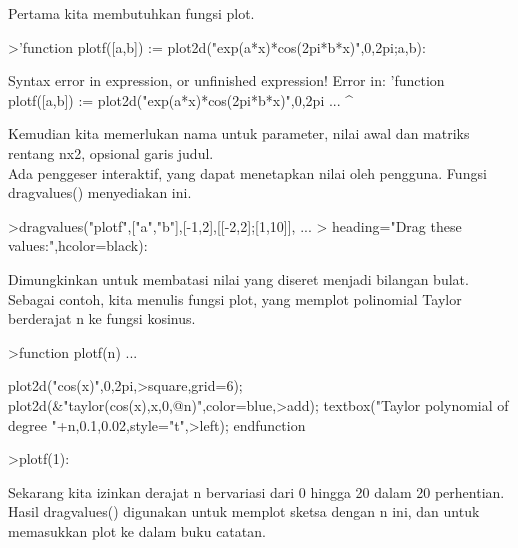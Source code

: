 \documentclass[a4paper,10pt]{article}
\begin{document}
\begin{eulernotebook}
\begin{eulercomment}
\begin{eulercomment}
\begin{eulercomment}
\begin{eulercomment}
\begin{eulercomment}
Pertama kita membutuhkan fungsi plot.
\end{eulercomment}
\begin{eulerprompt}
>'function plotf([a,b]) := plot2d("exp(a*x)*cos(2pi*b*x)",0,2pi;a,b):
\end{eulerprompt}
\begin{euleroutput}
  Syntax error in expression, or unfinished expression!
  Error in:
  'function plotf([a,b]) := plot2d("exp(a*x)*cos(2pi*b*x)",0,2pi ...
  ^
\end{euleroutput}
\begin{eulercomment}
Kemudian kita memerlukan nama untuk parameter, nilai awal dan matriks
rentang nx2, opsional garis judul.\\
Ada penggeser interaktif, yang dapat menetapkan nilai oleh pengguna.
Fungsi dragvalues() menyediakan ini.
\end{eulercomment}
\begin{eulerprompt}
>dragvalues("plotf",["a","b"],[-1,2],[[-2,2];[1,10]], ...
>  heading="Drag these values:",hcolor=black):
\end{eulerprompt}
\begin{eulercomment}
Dimungkinkan untuk membatasi nilai yang diseret menjadi bilangan
bulat. Sebagai contoh, kita menulis fungsi plot, yang memplot
polinomial Taylor berderajat n ke fungsi kosinus.
\end{eulercomment}
\begin{eulerprompt}
>function plotf(n) ...
\end{eulerprompt}
\begin{eulerudf}
  plot2d("cos(x)",0,2pi,>square,grid=6);
  plot2d(&"taylor(cos(x),x,0,@n)",color=blue,>add);
  textbox("Taylor polynomial of degree "+n,0.1,0.02,style="t",>left);
  endfunction
\end{eulerudf}
\begin{eulerprompt}
>plotf(1):
\end{eulerprompt}
\begin{eulercomment}
Sekarang kita izinkan derajat n bervariasi dari 0 hingga 20 dalam 20
perhentian. Hasil dragvalues() digunakan untuk memplot sketsa dengan n
ini, dan untuk memasukkan plot ke dalam buku catatan.

\end{eulercomment}
\end{eulercomment}
\end{eulercomment}
\end{eulercomment}
\end{eulercomment}
\end{eulernotebook}
\end{document}
